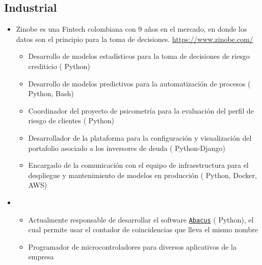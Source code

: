 \documentclass[11pt, letterpaper, sans]{moderncv}        %
\begin{document}
	\subsection{Industrial}
	\begin{itemize}
		\item
		{
			{
				Zinobe es una Fintech colombiana con 9 años en el mercado, en donde los datos son el principio para la toma de decisiones. \url{https://www.zinobe.com/}
				\vspace{3pt}
				\begin{itemize}
					\item Desarrollo de modelos estadísticos para la toma de decisiones de riesgo crediticio ({\color{blue} Python})
					\item Desarrollo de modelos predictivos para la automatización de procesos ({\color{blue} Python, Bash})
					\item Coordinador del proyecto de psicometría para la evaluación del perfil de riesgo de clientes ({\color{blue} Python})
					\item Desarrollador de la plataforma para la configuración y visualización del portafolio asociado a los inversores de deuda ({\color{blue} Python-Django})
					\item Encargado de la comunicación con el equipo de infraestructura para el despliegue y mantenimiento de modelos en producción ({\color{blue} Python, Docker, AWS})
				\end{itemize}
			}
		}
		\item
		{
			{
				\vspace{3pt}
				\begin{itemize}
					\item Actualmente responsable de desarrollar el software \href{https://www.tausand.com/downloads/}{\texttt{Abacus}} ({\color{blue} Python}), el cual permite usar el contador de coincidencias que lleva el mismo nombre
					\item Programador de microcontroladores para diversos aplicativos de la empresa
				\end{itemize}
			}
		}
		\vspace{6pt}
	\end{itemize}
	
	
\end{document}
